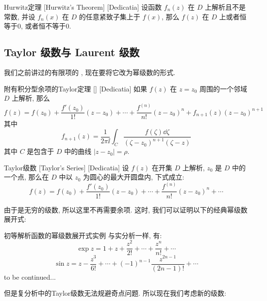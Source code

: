 \documentclass[UTF8]{ctexart}
\newcommand{\continued}{{\Large to be continued...}}
\begin{document}
        \begin{thm}
            [UUID]
            {Hurwitz定理}
            [Hurwitz's Theorem]
            [Dedicatia]
            设函数 \(f_n(z)\) 在 \(D\) 上解析且不是常数, 并设 \(f_n(x)\) 在 \(D\) 的任意紧致子集上 于 \(f(x)\), 那么 \(f(z)\) 在 \(D\) 上或者恒等于0, 或者恒不等于0.
        \end{thm}
    
    \subsection{Taylor 级数与 Laurent 级数}

        我们之前讲过的有限项的 , 现在要将它改为幂级数的形式. 

        \begin{thm}
            [UUID]
            {附有积分型余项的Taylor定理}
            []
            [Dedicatia]
            如果 \(f(z)\) 在 \(z=z_0\) 周围的一个邻域 \(D\) 上解析, 那么
            \[f(z)=f(z_0)+\frac{f'(z_0)}{1!}(z-z_0)+\cdots+\frac{f^{(n)}}{n!}(z-z_0)^n+f_{n+1}(z)(z-z_0)^{n+1}\]
            其中
            \[f_{n+1}(z)=\frac{1}{2\pi\ii}\int_C\frac{f(\zeta)\dd{\zeta}}{(\zeta-z_0)^{n+1}(\zeta-z)}\]
            其中 \(C\) 是包含于 \(D\) 中的曲线 \(|z-z_0|=\rho\). 
        \end{thm}

        \begin{thm}
            [TaylorSeries]
            {Taylor级数}
            [Taylor's Series]
            [Dedicatia]
            设 \(f(z)\) 在开集 \(D\) 上解析,  \(z_0\) 是 \(D\) 中的一个点, 那么在 \(D\) 中以 \(z_0\) 为圆心的最大开圆盘内, 下式成立: 
            \[f(z)=f(z_0)+\frac{f'(z_0)}{1!}(z-z_0)+\cdots+\frac{f^{(n)}}{n!}(z-z_0)^n+\cdots\]
        \end{thm}

        由于是无穷的级数, 所以这里不再需要余项. 这时, 我们可以证明以下的经典幂级数展开式: 

        \begin{xmp}
            {初等解析函数的幂级数展开式实例\label{xmp:TaylorCommon}}
            与实分析一样, 有: 
            \[\exp z=1+z+\frac{z^2}{2!}+\cdots+\frac{z^n}{n!}+\cdots\]
            \[\sin z=z-\frac{z^3}{6!}+\cdots+(-1)^{n-1}\frac{z^{2n-1}}{(2n-1)!}+\cdots\]
            \continued
        \end{xmp}

        但是复分析中的Taylor级数无法规避奇点问题. 所以现在我们考虑新的级数: 
\end{document}
